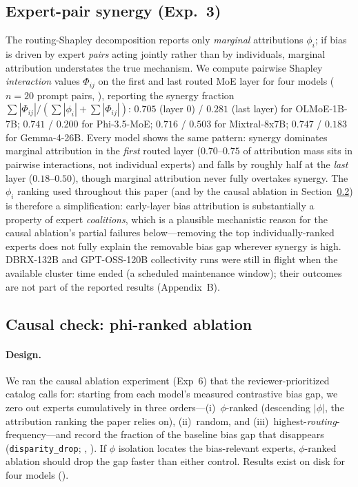 \documentclass[sigconf]{acmart}
\begin{document}
\subsection{Expert-pair synergy (Exp.\ 3)}
\label{sec:synergy}
The routing-Shapley decomposition reports only \emph{marginal}
attributions $\phi_i$; if bias is driven by expert \emph{pairs} acting
jointly rather than by individuals, marginal attribution understates the
true mechanism. We compute pairwise Shapley \emph{interaction} values
$\Phi_{ij}$ on the first and last routed MoE layer for four models
($n=20$ prompt pairs, ),
reporting the synergy fraction $\sum|\Phi_{ij}| / (\sum|\phi_i| +
\sum|\Phi_{ij}|)$: $0.705$ (layer 0) / $0.281$ (last layer) for
OLMoE-1B-7B; $0.741$ / $0.200$ for Phi-3.5-MoE; $0.716$ / $0.503$ for
Mixtral-8x7B; $0.747$ / $0.183$ for Gemma-4-26B. Every model shows the
same pattern: synergy dominates marginal attribution in the
\emph{first} routed layer ($0.70$--$0.75$ of attribution mass sits in
pairwise interactions, not individual experts) and falls by roughly half
at the \emph{last} layer ($0.18$--$0.50$), though marginal attribution
never fully overtakes synergy. The $\phi_i$ ranking used throughout this
paper (and by the causal ablation in Section~\ref{sec:causal}) is
therefore a simplification: early-layer bias attribution is
substantially a property of expert \emph{coalitions}, which is a
plausible mechanistic reason for the causal ablation's partial failures
below---removing the top individually-ranked experts does not fully
explain the removable bias gap wherever synergy is high. DBRX-132B and
GPT-OSS-120B collectivity runs were still in flight when the available
cluster time ended (a scheduled maintenance window); their outcomes are
not part of the reported results (Appendix~B).

\subsection{Causal check: phi-ranked ablation}
\label{sec:causal}
\paragraph{Design.}
We ran the causal ablation experiment (Exp~6) that the reviewer-prioritized
catalog calls for: starting from each model's measured contrastive bias gap,
we zero out experts cumulatively in three orders---(i)~$\phi$-ranked
(descending $|\phi|$, the attribution ranking the paper relies on),
(ii)~random, and (iii)~highest-\emph{routing}-frequency---and record the
fraction of the baseline bias gap that disappears
(\texttt{disparity\_drop}; ,
). If $\phi$ isolation locates the
bias-relevant experts, $\phi$-ranked ablation should drop the gap faster
than either control. Results exist on disk for four models
().
\end{document}
